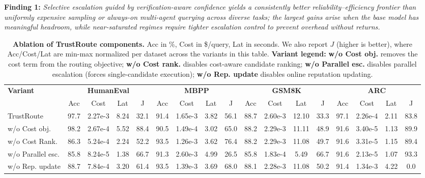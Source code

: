 \documentclass[acmsmall,screen,review,anonymous]{acmart}
\begin{document}
\begin{findingbox}
\textbf{Finding 1:} \textit{Selective escalation guided by verification-aware confidence yields a consistently better reliability--efficiency frontier than uniformly expensive sampling or always-on multi-agent querying across diverse tasks; the largest gains arise when the base model has meaningful headroom, while near-saturated regimes require tighter escalation control to prevent overhead without returns.}
\end{findingbox}





\begin{table}[t]
\centering
\footnotesize
\setlength{\tabcolsep}{2.4pt}
\renewcommand{\arraystretch}{1.12}
\caption{\textbf{Ablation of TrustRoute components.} Acc in \%, Cost in \$/query, Lat in seconds. We also report $J$ (higher is better), where Acc/Cost/Lat are min-max normalized per dataset across the variants in this table.
\textbf{Variant legend:} \textbf{w/o Cost obj.} removes the cost term from the routing objective; \textbf{w/o Cost rank.} disables cost-aware candidate ranking; \textbf{w/o Parallel esc.} disables parallel escalation (forces single-candidate execution); \textbf{w/o Rep. update} disables online reputation updating.}
\label{tab:ablation}

\begin{tabular}{lcccc cccc cccc cccc}
\toprule
\multirow{2}{*}{\textbf{Variant}} &
\multicolumn{4}{c}{\textbf{HumanEval}} &
\multicolumn{4}{c}{\textbf{MBPP}} &
\multicolumn{4}{c}{\textbf{GSM8K}} &
\multicolumn{4}{c}{\textbf{ARC}} \\
\cmidrule(lr){2-5}\cmidrule(lr){6-9}\cmidrule(lr){10-13}\cmidrule(lr){14-17}
& Acc & Cost & Lat & J & Acc & Cost & Lat & J & Acc & Cost & Lat & J & Acc & Cost & Lat & J \\
\midrule
TrustRoute             & 97.7 & 2.27e-3 & 8.24 & 32.1 & 91.4 & 1.65e-3 & 3.82 & 56.1 & 88.7 & 2.60e-3 & 12.10 & 33.3 & 97.1 & 2.26e-4 & 2.11 & 83.8 \\
w/o Cost obj.          & 98.2 & 2.67e-4 & 5.52 & 88.4 & 90.5 & 1.49e-4 & 3.02 & 65.0 & 88.2 & 2.29e-3 & 11.11 & 48.9 & 91.6 & 3.40e-5 & 1.13 & 89.9 \\
w/o Cost Rank.  & 86.3 & 5.24e-4 & 2.24 & 52.2 & 93.5 & 1.26e-3 & 3.62 & 76.4 & 88.2 & 2.29e-3 & 11.08 & 49.7 & 91.6 & 3.31e-5 & 1.15 & 89.4 \\
w/o Parallel esc.      & 85.8 & 8.24e-5 & 1.38 & 66.7 & 91.3 & 2.60e-3 & 4.99 & 26.5 & 85.8 & 1.83e-4 & 5.49 & 66.7 & 91.6 & 2.13e-5 & 1.07 & 93.3 \\
w/o Rep. update        & 88.7 & 7.84e-4 & 3.20 & 61.4 & 93.5 & 1.39e-3 & 3.69 & 68.0 & 88.1 & 2.28e-3 & 11.08 & 50.2 & 91.4 & 1.34e-3 & 4.22 & 0.0 \\
\bottomrule
\end{tabular}


\end{table}
\end{document}
